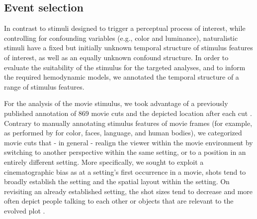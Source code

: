 \documentclass[english,11pt]{article}
\begin{document}
\subsection*{Event selection}

In contrast to stimuli designed to trigger a perceptual process of interest,
while controlling for confounding variables (e.g., color and luminance),
naturalistic stimuli have a fixed but initially unknown temporal structure of
stimulus features of interest, as well as an equally unknown confound structure.
In order to evaluate the suitability of the stimulus for the targeted analyses,
and to inform the required hemodynamic models, we annotated the temporal
structure of a range of stimulus features.

For the analysis of the movie stimulus, we took advantage of a previously
published annotation of 869 movie cuts and the depicted location after each cut
\citep{haeusler2016cutanno}.
Contrary to manually annotating stimulus features of movie frames (for example,
as performed by \citet{bartels2004mapping} for color, faces, language, and human
bodies), we categorized movie cuts that - in general - realign the viewer within
the movie environment by switching to another perspective within the same
setting, or to a position in an entirely different setting.
More specifically, we sought to exploit a cinematographic bias as
at a setting's first occurrence in a movie, shots tend to broadly establish the
setting and the spatial layout within the setting.
On revisiting an already established setting, the shot sizes tend to decrease
and more often depict people talking to each other or objects that are relevant
to the evolved plot
\citep{brown2012cinematography, katz1991film, mascelli1998five}.
\end{document}

